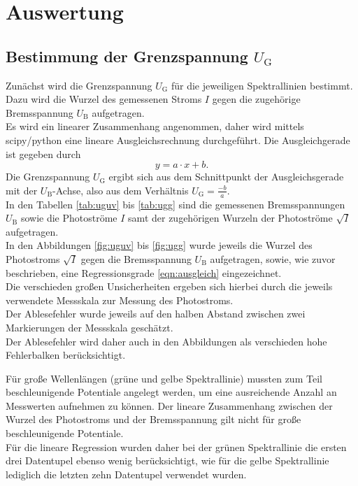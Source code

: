 \section{Auswertung}
\label{sec:Auswertung}

\subsection{Bestimmung der Grenzspannung $U_\mathrm{G}$}
Zunächst wird die Grenzspannung $U_\mathrm{G}$ für die jeweiligen Spektrallinien bestimmt. \\Dazu wird die Wurzel des gemessenen Stroms $I$ gegen die zugehörige Bremsspannung $U_\mathrm{B}$ aufgetragen.\\
Es wird ein linearer Zusammenhang angenommen, daher wird mittels scipy/python \cite{scipy} eine lineare Ausgleichsrechnung durchgeführt.
Die Ausgleichgerade ist gegeben durch
\begin{equation}
  \label{eqn:ausgleich}
y=a \cdot x +b \text{.}
\end{equation}
Die Grenzspannung $U_\mathrm{G}$ ergibt sich aus dem Schnittpunkt der Ausgleichsgerade mit der $U_\mathrm{B}$-Achse, also aus dem Verhältnis $U_\mathrm{G}=\frac{-b}{a}$.
\\In den Tabellen \ref{tab:uguv} bis \ref{tab:ugg} sind die gemessenen Bremsspannungen $U_\mathrm{B}$ sowie die Photoströme $I$ samt der zugehörigen Wurzeln der Photoströme $\sqrt{I}$ aufgetragen.\\
In den Abbildungen \ref{fig:uguv} bis \ref{fig:ugg} wurde jeweils die Wurzel des Photostroms $\sqrt{I}$ gegen die Bremsspannung $U_\mathrm{B}$ aufgetragen, sowie, wie zuvor beschrieben, eine Regressionsgrade \ref{eqn:ausgleich} eingezeichnet.\\
Die verschieden großen Unsicherheiten ergeben sich hierbei durch die jeweils verwendete Messskala zur Messung des Photostroms. \\Der Ablesefehler wurde jeweils auf den halben Abstand zwischen zwei Markierungen der Messskala geschätzt. \\Der Ablesefehler wird daher auch in den Abbildungen als verschieden hohe Fehlerbalken berücksichtigt.


Für große Wellenlängen (grüne und gelbe Spektrallinie) mussten zum Teil beschleunigende Potentiale angelegt werden, um eine ausreichende Anzahl an Messwerten aufnehmen zu können. Der lineare Zusammenhang zwischen der Wurzel des Photostroms und der Bremsspannung gilt nicht für große beschleunigende Potentiale.\\
Für die lineare Regression wurden daher bei der grünen Spektrallinie die ersten drei Datentupel ebenso wenig berücksichtigt, wie für die gelbe Spektrallinie lediglich die letzten zehn Datentupel verwendet wurden.\\


